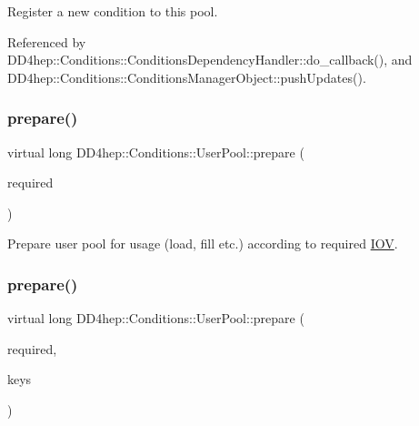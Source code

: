 Register a new condition to this pool. 



Referenced by D\+D4hep\+::\+Conditions\+::\+Conditions\+Dependency\+Handler\+::do\+\_\+callback(), and D\+D4hep\+::\+Conditions\+::\+Conditions\+Manager\+Object\+::push\+Updates().

\hypertarget{class_d_d4hep_1_1_conditions_1_1_user_pool_aebbb5c871d30372eb33955aef9bfcaf0}{}\label{class_d_d4hep_1_1_conditions_1_1_user_pool_aebbb5c871d30372eb33955aef9bfcaf0} 
\subsubsection{\texorpdfstring{prepare()}{prepare()}\hspace{0.1cm}{\footnotesize\ttfamily [1/2]}}
{\footnotesize\ttfamily virtual long D\+D4hep\+::\+Conditions\+::\+User\+Pool\+::prepare (\begin{DoxyParamCaption}\item[{const \hyperlink{class_d_d4hep_1_1_i_o_v}{I\+OV} \&}]{required }\end{DoxyParamCaption})\hspace{0.3cm}{\ttfamily [pure virtual]}}



Prepare user pool for usage (load, fill etc.) according to required \hyperlink{class_d_d4hep_1_1_i_o_v}{I\+OV}. 

\hypertarget{class_d_d4hep_1_1_conditions_1_1_user_pool_a91ce4579b205b59ef3012b8b97013abf}{}\label{class_d_d4hep_1_1_conditions_1_1_user_pool_a91ce4579b205b59ef3012b8b97013abf} 
\subsubsection{\texorpdfstring{prepare()}{prepare()}\hspace{0.1cm}{\footnotesize\ttfamily [2/2]}}
{\footnotesize\ttfamily virtual long D\+D4hep\+::\+Conditions\+::\+User\+Pool\+::prepare (\begin{DoxyParamCaption}\item[{const \hyperlink{class_d_d4hep_1_1_i_o_v}{I\+OV} \&}]{required,  }\item[{const \hyperlink{class_d_d4hep_1_1_conditions_1_1_user_pool_a6282d01af77401a4c20f08391d18cc95}{Condition\+Keys} \&}]{keys }\end{DoxyParamCaption})\hspace{0.3cm}{\ttfamily [pure virtual]}}



